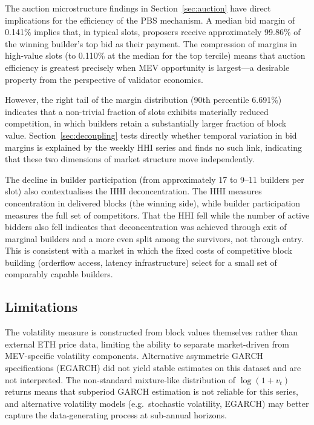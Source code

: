 \documentclass[11pt]{article}
\begin{document}
The auction microstructure findings in Section~\ref{sec:auction} have direct
implications for
the efficiency of the PBS mechanism. A median bid margin of 0.141\% implies
that, in typical slots, proposers receive approximately 99.86\% of the winning
builder's top bid as their payment. The compression of margins in high-value
slots (to 0.110\% at the median for the top tercile) means that auction
efficiency is greatest precisely when MEV opportunity is largest---a desirable
property from the perspective of validator economics.

However, the right tail of the margin distribution (90th percentile 6.691\%)
indicates that a non-trivial fraction of slots exhibits materially reduced
competition, in which builders retain a substantially larger fraction of block
value. Section~\ref{sec:decoupling} tests directly whether temporal variation
in bid margins is explained by the weekly HHI series and finds no such link,
indicating that these two dimensions of market structure move independently.

The decline in builder participation (from approximately 17 to 9--11
builders per slot) also contextualises the HHI deconcentration. The HHI
measures concentration in delivered blocks (the winning side), while builder
participation measures the full set of competitors. That the HHI fell while
the number of active bidders also fell indicates that deconcentration was
achieved through exit of marginal builders and a more even split among the
survivors, not through entry. This is consistent with a market in which the
fixed costs of competitive block building (orderflow access, latency
infrastructure) select for a small set of comparably capable builders.

\subsection{Limitations}
\label{sec:limitations}

The volatility measure is constructed from block values themselves rather than
external ETH price data, limiting the ability to separate market-driven from
MEV-specific volatility components. Alternative asymmetric GARCH specifications
(EGARCH) did not yield stable estimates on this dataset and are not interpreted.
The non-standard mixture-like distribution of $\log(1+v_t)$ returns means
that subperiod GARCH estimation is not reliable for this series, and alternative
volatility models (e.g.\ stochastic volatility, EGARCH) may better capture
the data-generating process at sub-annual horizons.
\end{document}
